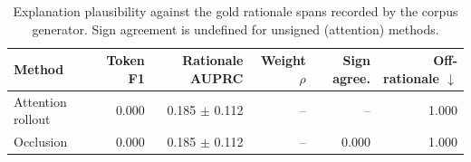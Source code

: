 \begin{table}[t]
\centering
\caption{Explanation plausibility against the gold rationale spans recorded by the corpus generator. Sign agreement is undefined for unsigned (attention) methods.}
\label{tab:plausibility}
\begin{tabular}{lrrrrr}
\toprule
Method & Token F1 & Rationale AUPRC & Weight $\rho$ & Sign agree. & Off-rationale $\downarrow$ \\
\midrule
Attention rollout & 0.000 & 0.185 $\pm$ 0.112 & -- & -- & 1.000 \\
Occlusion & 0.000 & 0.185 $\pm$ 0.112 & -- & 0.000 & 1.000 \\
\bottomrule
\end{tabular}
\end{table}
